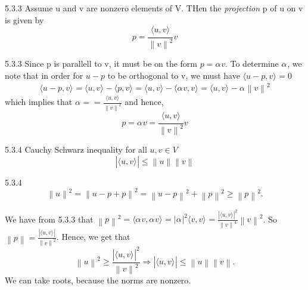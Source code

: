 \documentclass[a4paper,norsk]{article}
\renewcommand{\geq}{\geqslant}
\renewcommand{\leq}{\leqslant}
\begin{document}
\begin{propositionbox}{5.3.3}{}
Assume u and v are nonzero elements of V. THen the \textit{projection} p of u on v is given by
\[
    p = \frac{ \langle u, v \rangle_{  }  }{ \left\lVert v \right\rVert ^{2}  } v
\]

\begin{proofbox}{5.3.3}{}
  Since p is parallell to v, it must be on the form $ p = \alpha_{}^{} v $. To determine $ \alpha_{}^{}  $, we note that in order for $ u-p $ to be orthogonal to v, we must have $ \langle u-p, v  \rangle_{  } = 0  $ 
  \[
      \langle u-p, v \rangle_{  } = \langle u, v \rangle_{  } - \langle p, v \rangle_{  } = \langle u, v \rangle_{  } - \langle \alpha_{}^{}  v, v  \rangle_{  } = \langle u, v \rangle_{  } - \alpha_{}^{}  \left\lVert v \right\rVert ^{2}  
  \]
  which implies that $ \alpha_{}^{}  = = \frac{ \langle u, v \rangle_{  } }{ \left\lVert v \right\rVert ^{2}  }  $ and hence, 
  \[
      p = \alpha_{}^{} v = \frac{ \langle u, v \rangle_{  }  }{ \left\lVert v \right\rVert ^{2}  } v
  \]
\end{proofbox}
\end{propositionbox}


\begin{propositionbox}{5.3.4 Cauchy Schwarz inequality}{}
for all $ u, v \in V $ 
\[
    \left| \langle u, v \rangle_{  }  \right| \leq \left\lVert u \right\rVert   \left\lVert v \right\rVert 
\]

\begin{proofbox}{5.3.4}{}
  \[
      \left\lVert u \right\rVert ^{2 } = \left\lVert u -p + p\right\rVert ^{2}  = \left\lVert u-p \right\rVert ^{2} + \left\lVert p \right\rVert ^{2} \geq \left\lVert p \right\rVert ^{2}.   
  \]

  We have from 5.3.3 that $ \left\lVert p \right\rVert ^{2} = \langle \alpha_{}^{} v, \alpha_{}^{}  v \rangle_{  } = \left| \alpha_{}^{}  \right|^2 \langle v, v \rangle_{  }   = \frac{ \left| \langle u, v \rangle_{  }  \right|^2  }{ \left\lVert v \right\rVert ^{4}  }  \left\lVert v \right\rVert ^{2} $. So $ \left\lVert p \right\rVert = \frac{ \left| \langle u, v \rangle_{  }  \right|  }{ \left\lVert v \right\rVert ^{2}  } $. Hence, we get that 
  \[
      \left\lVert u \right\rVert ^{2} \geq \frac{ \left| \langle u, v \rangle_{  }  \right|^2  }{ \left\lVert v \right\rVert^2 } \Rightarrow \left| \langle u, v \rangle_{  }  \right| \leq  \left\lVert u \right\rVert \left\lVert v \right\rVert.
  \]
  We can take roots, because the norms are nonzero.
\end{proofbox}
\end{propositionbox}
\end{document}
